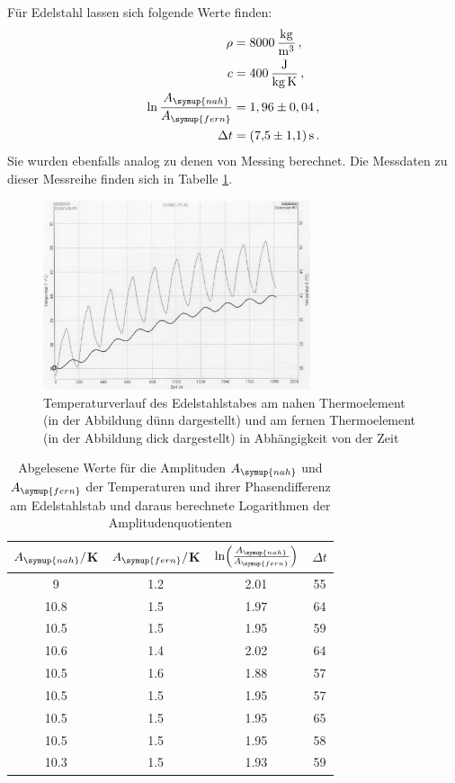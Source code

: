 Für Edelstahl lassen sich folgende Werte finden:
\begin{align}
  \rho &= \SI{8000}{\kilo\gram\per\cubic\meter}\,, \nonumber\\
  c &= \SI{400}{\joule\per\kilo\gram\per\kelvin}\,, \nonumber\\
  \ln{\frac{A_{\symup{nah}}}{A_{\symup{fern}}}} &= 1,96\pm 0,04 \,, \nonumber\\
  \Delta t &= \SI{7.5(11)}{\second} \,.\nonumber
\end{align}
Sie wurden ebenfalls analog zu denen von Messing berechnet. Die Messdaten zu dieser Messreihe
finden sich in Tabelle \ref{tab:edelstahl_welle}.

\begin{figure}
  \centering
  \includegraphics[width=0.7\textwidth]{data/t7undt8_welle.JPEG}
  \caption{Temperaturverlauf des Edelstahlstabes am nahen Thermoelement (in der Abbildung dünn dargestellt)
  und am fernen Thermoelement (in der Abbildung dick dargestellt) in Abhängigkeit von der Zeit}
  \label{fig:edelstahl_welle}
\end{figure}

\begin{table}
  \centering
  \caption{Abgelesene Werte für die Amplituden $A_{\symup{nah}}$ und $A_{\symup{fern}}$ der Temperaturen und
  ihrer Phasendifferenz am Edelstahlstab und daraus berechnete Logarithmen der Amplitudenquotienten}
  \label{tab:edelstahl_welle}
  \begin{tabular}{c c c c}
    \toprule
     $A_{\symup{nah}}/$K  & $A_{\symup{fern}}/$K & $\ln\Bigl(\frac{A_{\symup{nah}}}{A_{\symup{fern}}}\Bigr)$ & $\Delta t$ \\
    \midrule
    9	    & 1.2 &	2.01  & 55 \\
    10.8	& 1.5 & 1.97	& 64  \\
    10.5  &	1.5	& 1.95  & 59  \\
    10.6	& 1.4	& 2.02  & 64 \\
    10.5	& 1.6	& 1.88  & 57 \\
    10.5	& 1.5	& 1.95  & 57 \\
    10.5	& 1.5	& 1.95  & 65 \\
    10.5	& 1.5	& 1.95  & 58 \\
    10.3  &	1.5	& 1.93  & 59  \\
    \bottomrule
  \end{tabular}
\end{table}

